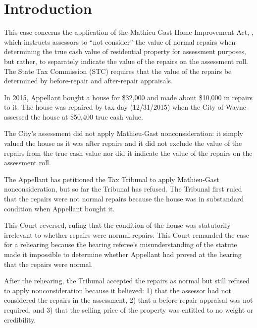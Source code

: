 \documentclass[12pt,\documentclassflag]{michiganCourtOfAppealsBrief}
\begin{document}
\newpage 
\section{Introduction}

This case concerns the application of the Mathieu-Gast Home Improvement Act, \cite[s]{MCL 211.27(2)}, which instructs assessors to ``not consider'' the value of normal repairs when determining the true cash value of residential property for assessment purposes, but rather, to separately indicate the value of the repairs on the assessment roll.
The State Tax Commission (STC) requires that the value of the repairs be determined by before-repair and after-repair appraisals.

In 2015, Appellant bought a house for \$32,000 and made about \$10,000 in repairs to it. The house was repaired by tax day (12/31/2015) when the City of Wayne assessed the house at \$50,400 true cash value.

The City's assessment did not apply Mathieu-Gast nonconsideration: it simply valued the house as it was after repairs and it did not exclude the value of the repairs from the true cash value nor did it indicate the value of the repairs on the assessment roll.

The Appellant has petitioned the Tax Tribunal to apply Mathieu-Gast nonconsideration, but so far the Tribunal has refused. The Tribunal first ruled that the repairs were not normal repairs because the house was in substandard condition when Appellant bought it.

This Court reversed, ruling that the condition of the house was statutorily irrelevant to whether repairs were normal repairs. This Court remanded the case for a rehearing because the hearing referee's misunderstanding of the statute made it impossible to determine whether Appellant had proved at the hearing that the repairs were normal.

After the rehearing, the Tribunal accepted the repairs as normal but still refused to apply nonconsideration because it believed:
1) that the assessor had not considered the repairs in the assessment,
2) that a before-repair appraisal was not required, and
3) that the selling price of the property was entitled to no weight or credibility.


\end{document}
